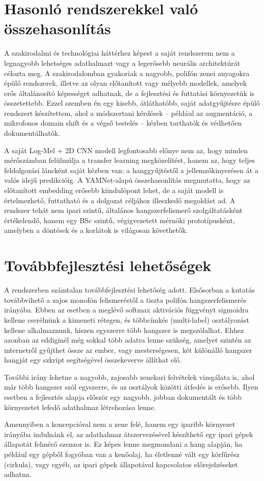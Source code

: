 \section{Hasonló rendszerekkel való összehasonlítás}
A szakirodalmi és technológiai háttérhez képest a saját rendszerem nem a legnagyobb lehetséges adathalmazt vagy a legerősebb neurális architektúrát célozta meg. A szakirodalomban gyakoriak a nagyobb, polifón zenei anyagokra épülő rendszerek, illetve az olyan előtanított vagy mélyebb modellek, amelyek erős általánosító képességet adhatnak, de a fejlesztési és futtatási környezetük is összetettebb. Ezzel szemben én egy kisebb, átláthatóbb, saját adatgyűjtésre épülő rendszert készítettem, ahol a módszertani kérdések -- például az augmentáció, a mikrofonos domain shift és a végső testelés -- kézben tarthatók és védhetően dokumentálhatók.

A saját Log-Mel + 2D CNN modell legfontosabb előnye nem az, hogy minden mérőszámban felülmúlja a transfer learning megközelítést, hanem az, hogy teljes feldolgozási láncként saját kézben van: a hanggyűjtéstől a jellemzőkinyerésen át a valós idejű predikcióig. A YAMNet-alapú összehasonlítás megmutatta, hogy az előtanított embedding erősebb kiindulópont lehet, de a saját modell is értelmezhető, futtatható és a dolgozat céljához illeszkedő megoldást ad. A rendszer tehát nem ipari szintű, általános hangszerfelismerő szolgáltatásként értékelendő, hanem egy BSc szintű, végigvezetett mérnöki prototípusként, amelyben a döntések és a korlátok is világosan követhetők.

\section{Továbbfejlesztési lehetőségek}
A rendszerben számtalan továbbfejlesztési lehetőség adott. Elsősorban a kutatás továbbvihető a zajos monofón felismeréstől a tiszta polifón hangszerfelismerés irányába. Ebben az esetben a meglévő softmax aktivációs függvényt sigmoidra kellene cserélnünk a kimeneti rétegen, és többcímkés (multi-label) osztályozást kellene alkalmaznunk, hiszen egyszerre több hangszer is megszólalhat. Ehhez azonban az eddiginél még sokkal több adatra lenne szükség, amelyet szintén az internetről gyűjthet össze az ember, vagy mesterségesen, két különálló hangszer hangját egy szkript segítségével összekeverve állíthat elő.

További irány lehetne a nagyobb, zajosabb zenekari felvételek vizsgálata is, ahol már több hangszer szól egyszerre, és az osztályok közötti átfedés is erősebb. Ilyen esetben a fejlesztés alapja először egy nagyobb, jobban dokumentált és több környezetet lefedő adathalmaz létrehozása lenne.

Amennyiben a koncepcióval nem a zene felé, hanem egy iparibb környezet irányába indulnánk el, az adathalmaz átszervezésével készíthető egy ipari gépek állapotát felmérő szenzor is. Ez képes lenne megmondani a hang alapján, ha például egy gépből fogyóban van a kenőolaj, ha életlenné vált egy körfűrész (cirkula), vagy egyéb, az ipari gépek állapotával kapcsolatos előrejelzéseket adhatna.

